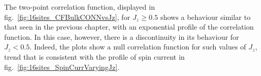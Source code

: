The two-point correlation function, displayed in fig.~\ref{fig:16sites_CFBulkCONNvsJz}, for $J_z \geq 0.5$ shows a behaviour similar to that seen in the previous chapter, with an exponential profile of the correlation function. In this case, however, there is a discontinuity in its behaviour for $J_z < 0.5$. Indeed, the plots show a null correlation function for such values of $J_z$, trend that is consistent with the profile of spin current in fig.~\ref{fig:16sites_SpinCurrVaryingJz}.

